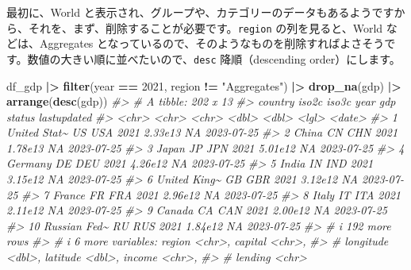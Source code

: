 \documentclass[
  xelatex, ja=standard]{bxjsbook}
\newenvironment{Shaded}{\begin{snugshade}}{\end{snugshade}}
\newcommand{\CommentTok}[1]{\textcolor[rgb]{0.56,0.35,0.01}{\textit{#1}}}
\newcommand{\DecValTok}[1]{\textcolor[rgb]{0.00,0.00,0.81}{#1}}
\newcommand{\FunctionTok}[1]{\textcolor[rgb]{0.13,0.29,0.53}{\textbf{#1}}}
\newcommand{\NormalTok}[1]{#1}
\newcommand{\SpecialCharTok}[1]{\textcolor[rgb]{0.81,0.36,0.00}{\textbf{#1}}}
\newcommand{\StringTok}[1]{\textcolor[rgb]{0.31,0.60,0.02}{#1}}
\theoremstyle{definition}
\theoremstyle{definition}
\theoremstyle{definition}
\theoremstyle{definition}
\theoremstyle{remark}
\begin{document}
最初に、World と表示され、グループや、カテゴリーのデータもあるようですから、それを、まず、削除することが必要です。\texttt{region} の列を見ると、World などは、Aggregates となっているので、そのようなものを削除すればよさそうです。数値の大きい順に並べたいので、\texttt{desc} 降順（descending order）にします。

\begin{Shaded}
\begin{Highlighting}[]
\NormalTok{df\_gdp }\SpecialCharTok{|\textgreater{}} \FunctionTok{filter}\NormalTok{(year }\SpecialCharTok{==} \DecValTok{2021}\NormalTok{, region }\SpecialCharTok{!=} \StringTok{"Aggregates"}\NormalTok{) }\SpecialCharTok{|\textgreater{}} 
  \FunctionTok{drop\_na}\NormalTok{(gdp) }\SpecialCharTok{|\textgreater{}} \FunctionTok{arrange}\NormalTok{(}\FunctionTok{desc}\NormalTok{(gdp))}
\CommentTok{\#\textgreater{} \# A tibble: 202 x 13}
\CommentTok{\#\textgreater{}    country      iso2c iso3c  year     gdp status lastupdated}
\CommentTok{\#\textgreater{}    \textless{}chr\textgreater{}        \textless{}chr\textgreater{} \textless{}chr\textgreater{} \textless{}dbl\textgreater{}   \textless{}dbl\textgreater{} \textless{}lgl\textgreater{}  \textless{}date\textgreater{}     }
\CommentTok{\#\textgreater{}  1 United Stat\textasciitilde{} US    USA    2021 2.33e13 NA     2023{-}07{-}25 }
\CommentTok{\#\textgreater{}  2 China        CN    CHN    2021 1.78e13 NA     2023{-}07{-}25 }
\CommentTok{\#\textgreater{}  3 Japan        JP    JPN    2021 5.01e12 NA     2023{-}07{-}25 }
\CommentTok{\#\textgreater{}  4 Germany      DE    DEU    2021 4.26e12 NA     2023{-}07{-}25 }
\CommentTok{\#\textgreater{}  5 India        IN    IND    2021 3.15e12 NA     2023{-}07{-}25 }
\CommentTok{\#\textgreater{}  6 United King\textasciitilde{} GB    GBR    2021 3.12e12 NA     2023{-}07{-}25 }
\CommentTok{\#\textgreater{}  7 France       FR    FRA    2021 2.96e12 NA     2023{-}07{-}25 }
\CommentTok{\#\textgreater{}  8 Italy        IT    ITA    2021 2.11e12 NA     2023{-}07{-}25 }
\CommentTok{\#\textgreater{}  9 Canada       CA    CAN    2021 2.00e12 NA     2023{-}07{-}25 }
\CommentTok{\#\textgreater{} 10 Russian Fed\textasciitilde{} RU    RUS    2021 1.84e12 NA     2023{-}07{-}25 }
\CommentTok{\#\textgreater{} \# i 192 more rows}
\CommentTok{\#\textgreater{} \# i 6 more variables: region \textless{}chr\textgreater{}, capital \textless{}chr\textgreater{},}
\CommentTok{\#\textgreater{} \#   longitude \textless{}dbl\textgreater{}, latitude \textless{}dbl\textgreater{}, income \textless{}chr\textgreater{},}
\CommentTok{\#\textgreater{} \#   lending \textless{}chr\textgreater{}}
\end{Highlighting}
\end{Shaded}
\end{document}
